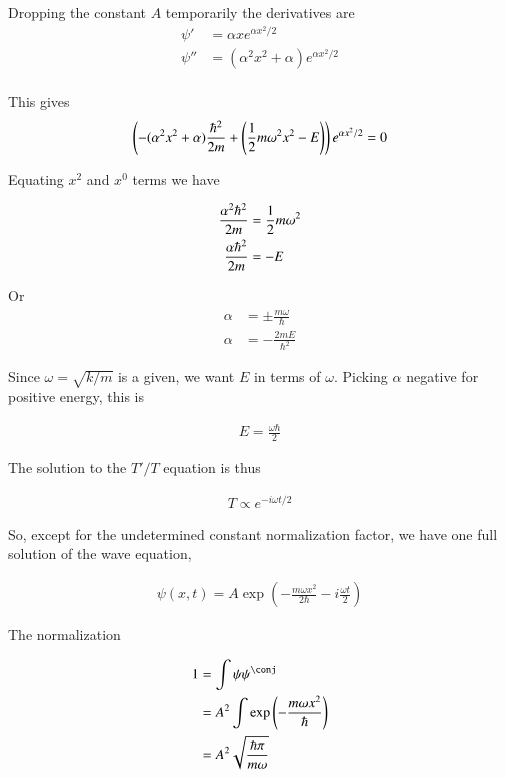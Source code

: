Dropping the constant $A$ temporarily the derivatives are
\begin{align*}
\psi' &= \alpha x e^{\alpha x^2/2} \\
\psi'' &= ( \alpha^2 x^2 + \alpha ) e^{\alpha x^2/2} \\
\end{align*}

This gives
\begin{align*}
\left( -( \alpha^2 x^2 + \alpha )\frac{\hbar^2}{2 m} + \left( \frac{1}{2}m \omega^2 x^2 - E \right) \right) e^{\alpha x^2/2} = 0
\end{align*}

Equating $x^2$ and $x^0$ terms we have

\begin{align*}
\frac{\alpha^2 \hbar^2}{2 m} &= \frac{1}{2}m \omega^2  \\
\frac{\alpha \hbar^2}{2 m} &= -E 
\end{align*}

Or
\begin{align*}
\alpha &= \pm \frac{ m \omega }{ \hbar }  \\
{\alpha } &= - \frac{2 m E }{\hbar^2}
\end{align*}

Since $\omega = \sqrt{k/m}$ is a given, we want $E$ in terms of $\omega$.  Picking $\alpha$ negative for positive energy, this is

\begin{align*}
E = \frac{ \omega \hbar }{ 2 } 
\end{align*}

The solution to the $T'/T$ equation is thus

\begin{align*}
T \propto e^{-i \omega t/2}
\end{align*}

So, except for the undetermined constant normalization factor, we have one full solution of the wave equation, 

\begin{align*}
\psi(x,t) = A \exp\left( - \frac{m \omega x^2 }{2 \hbar} - i \frac{\omega t}{2} \right)
\end{align*}

The normalization

\begin{align*}
1 
&= \int \psi \psi^\conj \\
&= A^2 \int \exp\left( - \frac{m \omega x^2 }{\hbar} \right) \\
&= A^2 \sqrt{ \frac{\hbar \pi}{ m \omega } }
\end{align*}

